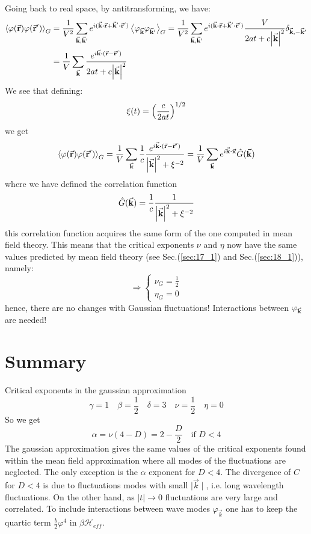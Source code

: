 \documentclass[../../Main/Main.tex]{subfiles}
\begin{document}
Going back to real space, by antitransforming, we have:
\begin{equation*}
\begin{split}
  \expval{\varphi (\va{r}) \varphi (\va{r}')}_G &= \frac{1}{V^2} \sum_{\va{k}, \va{k}'}^{} e^{i (\va{k}\vdot \va{r} + \va{k}' \vdot \va{r}' )} \expval{\varphi _{\va{k}} \varphi _{\va{k}'}}_G
  = \frac{1}{V^2} \sum_{\va{k}, \va{k}'}^{} e^{i (\va{k}\vdot \va{r} + \va{k}' \vdot \va{r}' )}   \frac{V}{2at+c\abs{\va{k}}^2} \delta _{\va{k}, -\va{k}'} \\
  & = \frac{1}{V} \sum_{\va{k}}^{} \frac{ e^{i \va{k}\vdot ( \va{r} - \va{r}' )}}{2 a t + c \abs{\va{k}}^2}
\end{split}
\end{equation*}
We see that defining:
\begin{equation*}
  \xi  (t) = \qty(\frac{c}{2at})^{1/2}
\end{equation*}
we get
\begin{equation}
    \expval{\varphi (\va{r}) \varphi (\va{r}')}_G = \frac{1}{ V } \sum_{\va{k}}^{} \frac{1}{c} \frac{ e^{i \va{k}\vdot ( \va{r} - \va{r}' )} }{ \abs{\va{k}}^2 + \xi ^{-2}}
    = \frac{1}{V} \sum_{\va{k}}^{} e^{i \va{k} \vdot \va{x}} \hat{G} (\va{k})
\end{equation}
where we have defined the correlation function
\begin{equation}
  \hat{G} (\va{k}) = \frac{1}{c} \frac{1}{   \abs{\va{k}}^2 + \xi ^{-2} }
\end{equation}
this correlation function acquires the same form of the one computed in mean field theory. This means that the critical exponents \( \nu  \) and \( \eta  \)  now have the same values predicted by mean field theory (see Sec.(\ref{sec:17_1}) and Sec.(\ref{sec:18_1})), namely:
\begin{equation}
\Rightarrow
  \begin{cases}
   \nu _{G} = \frac{1}{2}\\
   \eta_{G} = 0
  \end{cases}
\end{equation}
hence, there are no changes with Gaussian fluctuations! Interactions between \( \varphi _{\va{k}} \) are needed!


\section{Summary}

Critical exponents in the gaussian approximation
$$\gamma = 1 \quad \beta = \frac{1}{2} \quad  \delta = 3\quad \nu = \frac{1}{2}\quad  \eta = 0$$
So we get
$$\alpha = \nu(4-D) = 2 - \frac{D}{2}\quad  \text{if } D < 4$$
The gaussian approximation gives the same values of the critical exponents found within the mean field approximation where all modes of the fluctuations are neglected.
The only exception is the $\alpha$ exponent for $D < 4$. The divergence of $C$ for $D < 4$ is due to fluctuations modes with small $\mid \vec{k}\mid$, i.e. long wavelength fluctuations.
On the other hand, as $\mid t\mid \to 0$ fluctuations are very large and correlated.
To include interactions between wave modes $\varphi_{\vec{k}}$ one has to keep the quartic term $\frac{b}{2}\varphi^{4}$ in $\beta \mathcal{H}_{eff}$.
\end{document}
